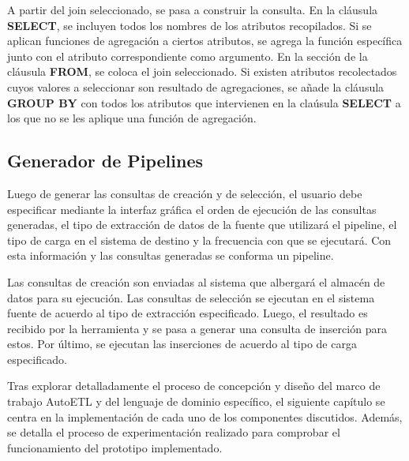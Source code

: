 A partir del join seleccionado, se pasa a construir la consulta. En la cláusula \textbf{SELECT}, se 
incluyen todos los nombres de los atributos recopilados. Si se aplican funciones de agregación a ciertos 
atributos, se agrega la función específica junto con el atributo correspondiente como argumento. En la sección 
de la cláusula 
\textbf{FROM}, se coloca el join seleccionado. Si existen atributos recolectados cuyos valores a seleccionar 
son resultado de agregaciones,  se añade 
la cláusula \textbf{GROUP BY} con todos los atributos que intervienen en la cla\'usula \textbf{SELECT} a los que no 
se les aplique una función de agregación.


\subsection{Generador de Pipelines}

Luego de generar las consultas de creación y de selección, el usuario debe especificar 
mediante la interfaz gráfica el orden de ejecución de las consultas generadas, 
el tipo de extracción de datos de la fuente que utilizar\'a el pipeline, el tipo de carga 
en el sistema de destino y la frecuencia con que se ejecutar\'a. Con esta información y las 
consultas generadas se conforma un pipeline. 

Las consultas de creación son enviadas al sistema que albergar\'a el almacén de 
datos para su ejecución. Las consultas de selección se ejecutan en el sistema fuente de acuerdo al tipo 
de extracción especificado. Luego, el resultado es recibido por la herramienta y se pasa a generar una consulta 
de inserción para estos. Por \'ultimo, se ejecutan las inserciones de acuerdo al tipo de carga especificado.


Tras explorar detalladamente el proceso de concepción y diseño del marco de trabajo AutoETL y del 
lenguaje de dominio específico, el siguiente cap\'itulo se centra en la
implementaci\'on de cada uno de los componentes discutidos. Además, se detalla el proceso 
de experimentaci\'on realizado para comprobar el funcionamiento del prototipo implementado.
